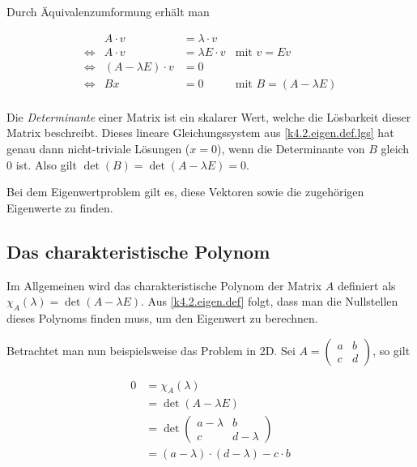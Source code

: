 \documentclass[]{dsadokumentation}
\begin{document}
Durch Äquivalenzumformung erhält man

\begin{equation}
  \label{k4.2.eigen.def.lgs}
  \begin{aligned}
     &                 & A \cdot v               & = \lambda \cdot v   &                                 & \\
     & \Leftrightarrow & A \cdot v               & = \lambda E \cdot v & \text{mit } v = Ev              & \\
     & \Leftrightarrow & (A - \lambda E) \cdot v & = 0                 &                                 & \\
     & \Leftrightarrow & Bx                      & = 0  \quad \quad    & \text{mit } B = (A - \lambda E) & \\
  \end{aligned}
\end{equation}

Die \emph{Determinante} einer Matrix ist ein skalarer Wert, welche die Lösbarkeit dieser Matrix beschreibt. Dieses lineare Gleichungssystem aus \cref{k4.2.eigen.def.lgs} hat genau dann nicht-triviale Lösungen ($x = 0$), wenn die Determinante von $B$ gleich $0$ ist. Also gilt $\det (B) = \det (A - \lambda E) = 0$.

Bei dem Eigenwertproblem gilt es, diese Vektoren sowie die zugehörigen Eigenwerte zu finden.


\subsection{Das charakteristische Polynom}

Im Allgemeinen wird das charakteristische Polynom der Matrix $A$ definiert als $\chi_A (\lambda) = \det(A - \lambda E)$. Aus \cref{k4.2.eigen.def} folgt, dass man die Nullstellen dieses Polynoms finden muss, um den Eigenwert zu berechnen.

Betrachtet man nun beispielsweise das Problem in 2D. Sei $A = \begin{pmatrix}
    a & b \\
    c & d
  \end{pmatrix}$, so gilt

\begin{equation}
  \label{k4.2.eigen.charac.2d}
  \begin{aligned}
    0
     & = \chi_A (\lambda)                              \\
     & = \det(A - \lambda E)                           \\
     & = \det \begin{pmatrix}
                a - \lambda & b         \\
                c           & d-\lambda
              \end{pmatrix}                  \\
     & = (a - \lambda) \cdot (d - \lambda) - c \cdot b
  \end{aligned}
\end{equation}
\end{document}
